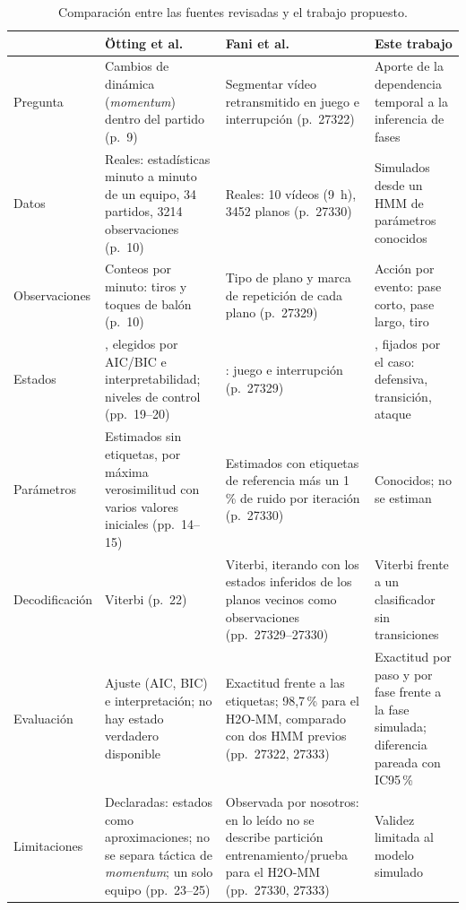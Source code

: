\documentclass[11pt,a4paper]{article}
\begin{document}
\begin{table}[ht]
\centering
\caption{Comparación entre las fuentes revisadas y el trabajo propuesto.}
\label{tab:sota}
\footnotesize
\begin{tabularx}{\textwidth}{>{\raggedright\arraybackslash}p{2.3cm}
  >{\raggedright\arraybackslash}X >{\raggedright\arraybackslash}X
  >{\raggedright\arraybackslash}X}
\toprule
 & Ötting et al.\ \cite{otting2023} & Fani et al.\ \cite{fani2017} & Este trabajo \\
\midrule
Pregunta & Cambios de dinámica (\emph{momentum}) dentro del partido (p.~9) &
Segmentar vídeo retransmitido en juego e interrupción (p.~27322) &
Aporte de la dependencia temporal a la inferencia de fases \\
Datos & Reales: estadísticas minuto a minuto de un equipo, 34 partidos, 3214
observaciones (p.~10) & Reales: 10 vídeos (9~h), 3452 planos (p.~27330) &
Simulados desde un HMM de parámetros conocidos \\
Observaciones & Conteos por minuto: tiros y toques de balón (p.~10) &
Tipo de plano y marca de repetición de cada plano (p.~27329) &
Acción por evento: pase corto, pase largo, tiro \\
Estados & 3, elegidos por AIC/BIC e interpretabilidad; niveles de control
(pp.~19--20) & 2: juego e interrupción (p.~27329) &
3, fijados por el caso: defensiva, transición, ataque \\
Parámetros & Estimados sin etiquetas, por máxima verosimilitud con varios
valores iniciales (pp.~14--15) & Estimados con etiquetas de referencia más un
1\,\% de ruido por iteración (p.~27330) & Conocidos; no se estiman \\
Decodificación & Viterbi (p.~22) & Viterbi, iterando con los estados inferidos
de los planos vecinos como observaciones (pp.~27329--27330) &
Viterbi frente a un clasificador sin transiciones \\
Evaluación & Ajuste (AIC, BIC) e interpretación; no hay estado verdadero
disponible & Exactitud frente a las etiquetas; 98,7\,\% para el H2O-MM, comparado
con dos HMM previos (pp.~27322, 27333) & Exactitud por paso y por fase frente a
la fase simulada; diferencia pareada con IC95\,\% \\
Limitaciones & Declaradas: estados como aproximaciones; no se separa táctica de
\emph{momentum}; un solo equipo (pp.~23--25) & Observada por nosotros: en lo
leído no se describe partición entrenamiento/prueba para el H2O-MM (pp.~27330,
27333) & Validez limitada al modelo simulado \\
\bottomrule
\end{tabularx}
\end{table}
\end{document}
